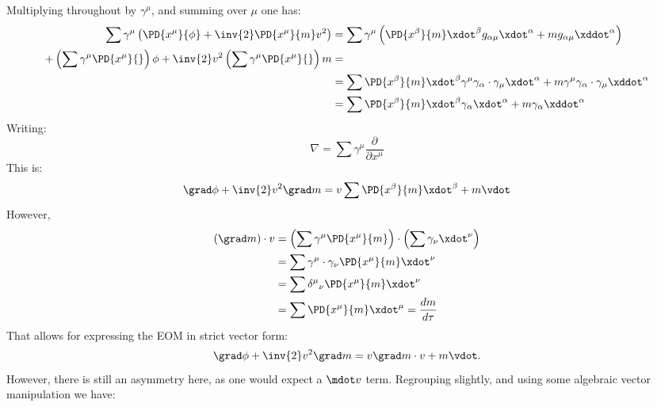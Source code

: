 Multiplying throughout by \(\gamma^{\mu}\), and summing over \(\mu\) one has:
%
\begin{equation}\label{eqn:massVaryLagrangian:140}
\begin{aligned}
\sum \gamma^{\mu} \left( \PD{x^{\mu}}{\phi} + \inv{2} \PD{x^{\mu}}{m} v^2 \right)
&= \sum \gamma^{\mu} \left(\PD{x^{\beta}}{m} \xdot^{\beta} g_{\alpha\mu} \xdot^{\alpha} + m g_{\alpha\mu} \xddot^{\alpha} \right) \\
+ \left(\sum \gamma^{\mu} \PD{x^{\mu}}{}\right) \phi + \inv{2} v^2 \left(\sum \gamma^{\mu} \PD{x^{\mu}}{}\right) m &= \\
&= \sum \PD{x^{\beta}}{m} \xdot^{\beta} \gamma^{\mu} \gamma_{\alpha} \cdot \gamma_{\mu} \xdot^{\alpha} + m \gamma^{\mu} \gamma_{\alpha} \cdot \gamma_{\mu} \xddot^{\alpha}  \\
&= \sum \PD{x^{\beta}}{m} \xdot^{\beta} \gamma_{\alpha} \xdot^{\alpha} + m \gamma_{\alpha} \xddot^{\alpha}  \\
\end{aligned}
\end{equation}
%
Writing:
\begin{equation*}
\nabla = \sum \gamma^{\mu} \frac{\partial}{\partial x^{\mu}}
\end{equation*}
%
This is:
\begin{equation*}
\grad \phi + \inv{2} v^2 \grad m = v \sum \PD{x^{\beta}}{m} \xdot^{\beta} + m \vdot
\end{equation*}
%
However,
\begin{equation}\label{eqn:massVaryLagrangian:160}
\begin{aligned}
(\grad m) \cdot v
&=
\left(\sum \gamma^{\mu} \PD{x^{\mu}}{m}\right) \cdot \left( \sum \gamma_{\nu} \xdot^{\nu} \right) \\
&= \sum \gamma^{\mu} \cdot \gamma_{\nu} \PD{x^{\mu}}{m} \xdot^{\nu} \\
&= \sum {\delta^{\mu}}_{\nu} \PD{x^{\mu}}{m} \xdot^{\nu} \\
&= \sum \PD{x^{\mu}}{m} \xdot^{\mu} = \frac{dm}{d\tau}
\end{aligned}
\end{equation}
%
That allows for expressing the EOM in strict vector form:
\begin{equation}
\grad \phi + \inv{2} v^2 \grad m = v \grad m \cdot v + m \vdot.
\end{equation}
%
However, there is still an asymmetry here, as one would expect a \(\mdot v\) term.  Regrouping slightly, and using some algebraic vector
manipulation we have:
